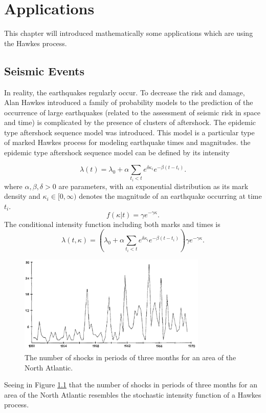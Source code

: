 \chapter{Applications}
This chapter will introduced mathematically some applications which are using the Hawkes process.

\section{Seismic Events}
In reality, the earthquakes regularly occur. To decrease the risk and damage, Alan Hawkes introduced a family of probability models to the prediction of the occurrence of large earthquakes (related to the assessment of seismic risk in space and time) is complicated by the presence of clusters of aftershock. The epidemic type aftershock sequence model was introduced. This model is a particular type of marked Hawkes process for modeling earthquake times and magnitudes. the epidemic type aftershock sequence model can be defined by its intensity

$$\lambda(t) = \lambda_{0} + \alpha \sum_{t_{i} < t} e^{\delta\kappa_{i}} e^{-\beta(t-t_{i})}.$$
where $\alpha, \beta, \delta > 0 $ are parameters, with an exponential distribution as its mark density  and $\kappa_{i} \in [0, \infty)$ denotes the magnitude of an earthquake occurring
at time $t_{i}.$
$$f(\kappa|t) = \gamma e^{-\gamma\kappa}.$$
The conditional intensity function including both marks and times is
$$\lambda(t,\kappa) =( \lambda_{0} + \alpha \sum_{t_{i} < t} e^{\delta\kappa_{i}} e^{-\beta(t-t_{i})})\gamma e^{-\gamma\kappa}.$$

 \begin{figure}[H]
 	\centering
 	\includegraphics[width=0.8\textwidth ]{Application_Seismic.PNG}
 	\caption{The number of shocks in periods of three months for an area of the North Atlantic.}
 	\label{Application_Seismic}
 \end{figure}

Seeing in Figure \ref{Application_Seismic} that the number of shocks in periods of three months for an area of the North
Atlantic resembles the stochastic intensity function of a Hawkes process.

